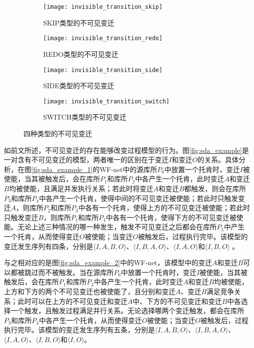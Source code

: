 \begin{figure}[htbp]
  \centering
  \begin{subfigure}[b]{0.48\textwidth}
    \centering
    \texttt{[image: invisible\_transition\_skip]}
    \caption{SKIP类型的不可见变迁}
    \label{fig:invisible_transition_skip}
  \end{subfigure}
  \begin{subfigure}[b]{0.48\textwidth}
    \centering
    \texttt{[image: invisible\_transition\_redo]}
    \caption{REDO类型的不可见变迁}
    \label{fig:invisible_transition_redo}
  \end{subfigure}
  \begin{subfigure}[b]{0.48\textwidth}
    \vspace{1em}
    \centering
    \texttt{[image: invisible\_transition\_side]}
    \caption{SIDE类型的不可见变迁}
    \label{fig:invisible_transition_side}
  \end{subfigure}
  \begin{subfigure}[b]{0.48\textwidth}
    \vspace{1em}
    \centering
    \texttt{[image: invisible\_transition\_switch]}
    \caption{SWITCH类型的不可见变迁}
    \label{fig:invisible_transition_switch}
  \end{subfigure}
  \caption{四种类型的不可见变迁}
  \label{fig:invisible_transition_types}
\end{figure}

如前文所述，不可见变迁的存在能够改变过程模型的行为。图\ref{fig:sda_example}是一对含有不可见变迁的模型，两者唯一的区别在于变迁$I$和变迁$O$的关系。具体分析，在图\ref{fig:sda_example_1}的WF-net中的源库所$P_{0}$中放置一个托肯时，变迁$I$被使能，当其被触发后，会在库所$P_{1}$和库所$P_{2}$中各产生一个托肯，此时变迁$A$和变迁$B$均被使能，且满足并发执行关系；若此时将变迁$A$和变迁$B$都触发，则会在库所$P_{3}$和库所$P_{4}$中各产生一个托肯，使得中间的不可见变迁被使能；若此时只触发变迁$A$，则库所$P_{2}$和库所$P_{3}$中各有一个托肯，使得上方的不可见变迁被使能；若此时只触发变迁$B$，则库所$P_{1}$和库所$P_{4}$中各有一个托肯，使得下方的不可见变迁被使能。无论上述三种情况的哪一种发生，触发不可见变迁之后都会在库所$P_{5}$中产生一个托肯，从而使得变迁$O$被使能；当变迁$O$被触发后，过程执行完毕。该模型的变迁发生序列有四条，分别是$\langle I,A,B,O\rangle$、$\langle I,B,A,O\rangle$、$\langle I,A,O\rangle$和$\langle I,B,O\rangle$
。

与之相对应的是图\ref{fig:sda_example_2}中的WF-net，该模型中的变迁$A$和变迁$B$可以都被跳过而不被触发。当在源库所$P_{0}$中放置一个托肯时，变迁$I$被使能，当其被触发后，会在库所$P_{1}$和库所$P_{2}$中各产生一个托肯，此时变迁$A$和变迁$B$均被使能，上方和下方的两个不可见变迁也被使能了，且分别和变迁$A$、变迁$B$满足竞争关系；此时可以在上方的不可见变迁和变迁$A$中、下方的不可见变迁和变迁$B$中各选择一个触发，且触发过程满足并行关系。无论选择哪两个变迁触发，都会在库所$P_{3}$和库所$P_{4}$中各产生一个托肯，从而使得变迁$O$被使能；当变迁$O$被触发后，过程执行完毕。该模型的变迁发生序列有五条，分别是$\langle I,A,B,O\rangle$、$\langle I,B,A,O\rangle$、$\langle I,A,O\rangle$、$\langle I,B,O\rangle$和$\langle I,O\rangle$。

